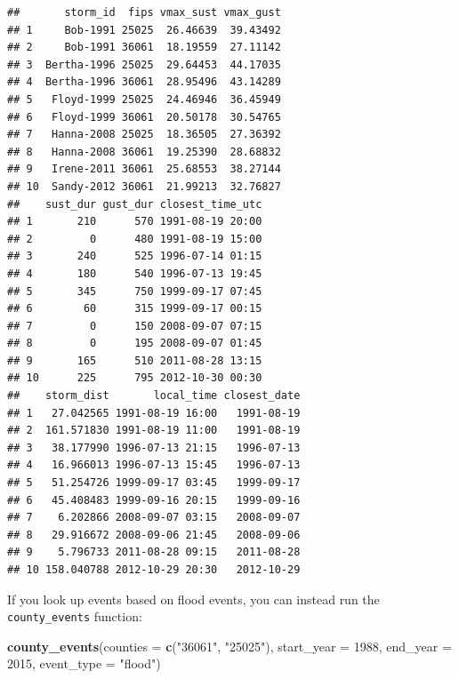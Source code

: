 \documentclass[]{tufte-book}
\newenvironment{Shaded}{}{}
\newcommand{\DataTypeTok}[1]{\textcolor[rgb]{0.56,0.13,0.00}{#1}}
\newcommand{\DecValTok}[1]{\textcolor[rgb]{0.25,0.63,0.44}{#1}}
\newcommand{\KeywordTok}[1]{\textcolor[rgb]{0.00,0.44,0.13}{\textbf{#1}}}
\newcommand{\NormalTok}[1]{#1}
\newcommand{\StringTok}[1]{\textcolor[rgb]{0.25,0.44,0.63}{#1}}
\begin{document}
\begin{verbatim}
##       storm_id  fips vmax_sust vmax_gust
## 1     Bob-1991 25025  26.46639  39.43492
## 2     Bob-1991 36061  18.19559  27.11142
## 3  Bertha-1996 25025  29.64453  44.17035
## 4  Bertha-1996 36061  28.95496  43.14289
## 5   Floyd-1999 25025  24.46946  36.45949
## 6   Floyd-1999 36061  20.50178  30.54765
## 7   Hanna-2008 25025  18.36505  27.36392
## 8   Hanna-2008 36061  19.25390  28.68832
## 9   Irene-2011 36061  25.68553  38.27144
## 10  Sandy-2012 36061  21.99213  32.76827
##    sust_dur gust_dur closest_time_utc
## 1       210      570 1991-08-19 20:00
## 2         0      480 1991-08-19 15:00
## 3       240      525 1996-07-14 01:15
## 4       180      540 1996-07-13 19:45
## 5       345      750 1999-09-17 07:45
## 6        60      315 1999-09-17 00:15
## 7         0      150 2008-09-07 07:15
## 8         0      195 2008-09-07 01:45
## 9       165      510 2011-08-28 13:15
## 10      225      795 2012-10-30 00:30
##    storm_dist       local_time closest_date
## 1   27.042565 1991-08-19 16:00   1991-08-19
## 2  161.571830 1991-08-19 11:00   1991-08-19
## 3   38.177990 1996-07-13 21:15   1996-07-13
## 4   16.966013 1996-07-13 15:45   1996-07-13
## 5   51.254726 1999-09-17 03:45   1999-09-17
## 6   45.408483 1999-09-16 20:15   1999-09-16
## 7    6.202866 2008-09-07 03:15   2008-09-07
## 8   29.916672 2008-09-06 21:45   2008-09-06
## 9    5.796733 2011-08-28 09:15   2011-08-28
## 10 158.040788 2012-10-29 20:30   2012-10-29
\end{verbatim}

If you look up events based on flood events, you can instead run the
\texttt{county\_events} function:

\begin{Shaded}
\begin{Highlighting}[]
\KeywordTok{county_events}\NormalTok{(}\DataTypeTok{counties =} \KeywordTok{c}\NormalTok{(}\StringTok{"36061"}\NormalTok{, }\StringTok{"25025"}\NormalTok{), }
    \DataTypeTok{start_year =} \DecValTok{1988}\NormalTok{, }\DataTypeTok{end_year =} \DecValTok{2015}\NormalTok{, }\DataTypeTok{event_type =} \StringTok{"flood"}\NormalTok{)}
\end{Highlighting}
\end{Shaded}
\end{document}
